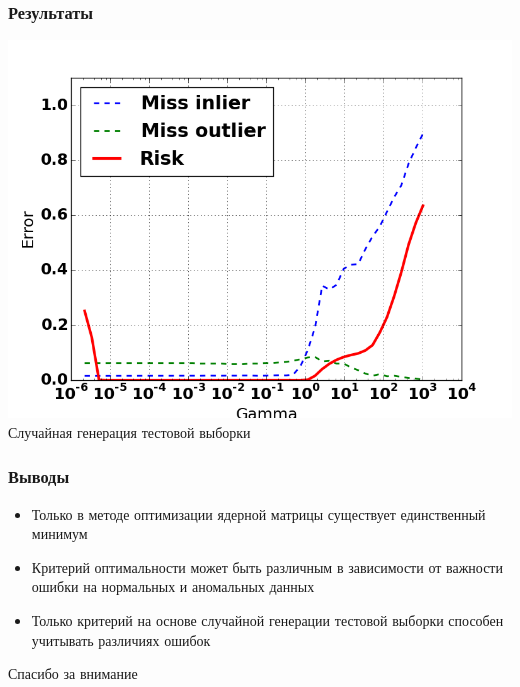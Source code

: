 \documentclass[10pt,pdf]{beamer}
\begin{document}
\begin{frame}\frametitle{Результаты}
\centering
\includegraphics[scale=0.35]{random_generation_metric}\\
Случайная генерация тестовой выборки


\end{frame}

\begin{frame}\frametitle{Выводы}
\begin{itemize}

\item Только в методе оптимизации ядерной матрицы существует единственный минимум
\item Критерий оптимальности может быть различным в зависимости от важности ошибки на нормальных и аномальных данных
\item Только критерий на основе случайной генерации тестовой выборки способен учитывать различиях ошибок
\end{itemize}
\end{frame}

\begin{frame}
\begin{center}
\Huge{Спасибо за внимание}
\end{center}
\end{frame}
\end{document}
